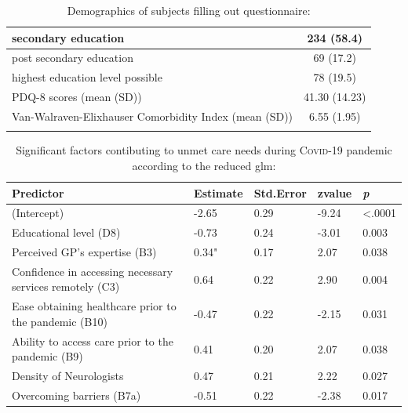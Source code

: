 \documentclass{bmcart}
\begin{document}
\begin{backmatter}
\begin{table}[!ht]
\begin{tabular}{p{5cm} c}
\hspace{3mm} secondary education 						 					& 	234 (58.4)		\\ \hline
\hspace{3mm} post secondary education  										&   	69 (17.2) 		\\ \hline
\hspace{3mm} highest education level possible 										& 	78 (19.5)  		\\ \hline
\hspace{3mm} PDQ-8 scores (mean (SD)) 										& 	41.30 (14.23) 	\\ \hline
Van-Walraven-Elixhauser \newline \hspace{3mm} Comorbidity Index (mean (SD)) 	& 	6.55 (1.95) 		\\ 
\bottomrule
\caption{Demographics of subjects filling out questionnaire:}
\label{tab1:demographics}
\end{tabular}
\end{table}

\begin{table}[!ht]
    \centering
    \begin{tabular}{l l l l l}
    	\toprule    
        Predictor 												& Estimate 	& Std.Error & zvalue & \textit{p} \\
        \midrule
        (Intercept) 											&  -2.65  		& 0.29 	& -9.24 	& <.0001 \\ \hline
        Educational level (D8) 									& -0.73 		& 0.24 	& -3.01 	& 0.003 \\ \hline
        Perceived GP's expertise (B3) 							& 0.34" 		& 0.17 	& 2.07 	& 0.038 \\ \hline
        Confidence in accessing necessary services remotely (C3) 	& 0.64 		& 0.22 	& 2.90 	& 0.004 \\ \hline
        Ease obtaining healthcare prior to the pandemic (B10)		& -0.47 		& 0.22 	& -2.15 	& 0.031 \\ \hline
        Ability to access care prior to the pandemic (B9)				& 0.41 		& 0.20 	& 2.07 	& 0.038 \\ \hline
        Density of Neurologists 									& 0.47 		& 0.21 	& 2.22 	& 0.027 \\ \hline
        Overcoming barriers (B7a)   								& -0.51 		& 0.22 	& -2.38 	& 0.017 \\
        \bottomrule
    \end{tabular}
\caption{Significant factors contibuting to unmet care needs during \textsc{Covid}-19 pandemic according to the reduced \ac{glm}:}
\end{table}	


\end{backmatter}
\end{document}
